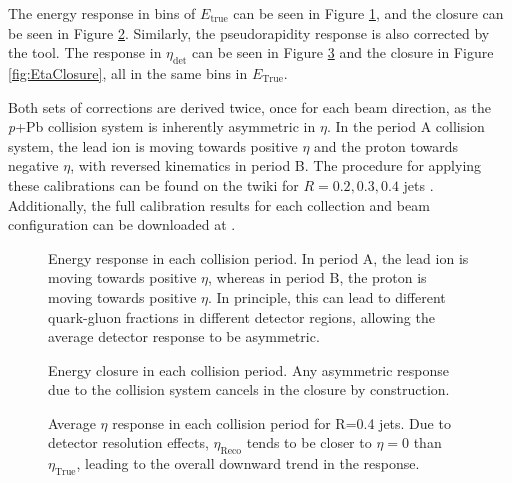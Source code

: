 \documentclass[NOTE, atlasdraft=true, texlive=2016, USenglish]{\ATLASLATEXPATH atlasdoc}
\begin{document}
The energy response in bins of $E_{\text{true}}$ can be seen in Figure \ref{fig:EnergyResponse}, and the closure can be seen in Figure \ref{fig:EnergyClosure}. Similarly, the pseudorapidity response is also corrected by the tool. The response in $\eta_{\text{det}}$ can be seen in Figure \ref{fig:EtaResponse} and the closure in Figure \ref{fig:EtaClosure}, all in the same bins in $E_{\text{True}}$.\par
Both sets of corrections are derived twice, once for each beam direction, as the \textit{p}+Pb collision system is inherently asymmetric in $\eta$. In the period A collision system, the lead ion is moving towards positive $\eta$ and the proton towards negative $\eta$, with reversed kinematics in period B. The procedure for applying these calibrations can be found on the twiki for $R=0.2, 0.3, 0.4$ jets \cite{HIRun2JESdata2016}. Additionally, the full calibration results for each collection and beam configuration can be downloaded at \cite{pPbR4,pPbR3,pPbR2,PbpR4,PbpR3,PbpR2}.

\begin{figure}[htbp]
	\centering
	\caption{Energy response in each collision period. In period A, the lead ion is moving towards positive $\eta$, whereas in period B, the proton is moving towards positive $\eta$. In principle, this can lead to different quark-gluon fractions in different detector regions, allowing the average detector response to be asymmetric.}
	\label{fig:EnergyResponse}
\end{figure}

\begin{figure}[htbp]
	\centering
	\caption{Energy closure in each collision period. Any asymmetric response due to the collision system cancels in the closure by construction.}
	\label{fig:EnergyClosure}
\end{figure}

\begin{figure}[htbp]
	\centering
	\caption{Average $\eta$ response in each collision period for R=0.4 jets. Due to detector resolution effects, $\eta_{\text{Reco}}$ tends to be closer to $\eta = 0$ than $\eta_{\text{True}}$, leading to the overall downward trend in the response.}
	\label{fig:EtaResponse}
\end{figure}
\end{document}

